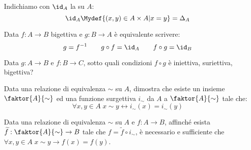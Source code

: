 \documentclass[11pt]{scrartcl}
\begin{document}
\begin{notation}
	Indichiamo con $\id_A$ la  su $A$:
	\[ \id_A \Mydef \{(x,y) \in A \times A | x = y\} = \Delta_A
		\]
\end{notation}

\begin{remark}
	Data $f : A \rightarrow B$ bigettiva e $g : B \rightarrow A$ è equivalente scrivere:
	\[ g = f^{-1} \qquad g \circ f = \id_A \qquad f \circ g = \id_B
		\]
\end{remark}

\begin{exercise}
	Data $g : A \rightarrow B$ e $f: B \rightarrow C$, sotto quali condizioni $f \circ g$ è iniettiva, suriettiva, bigettiva?
\end{exercise}

\begin{exercise}
	Data una relazione di equivalenza $\sim$ su $A$, dimostra che esiste un insieme $\faktor{A}{\sim}$ ed una funzione surgettiva $i_\sim$ da $A$ a $\faktor{A}{\sim}$
	tale che:
	\[ \forall x,y \in A \; x \sim y \leftrightarrow i_\sim(x) = i_\sim(y)
		\]
\end{exercise}

\begin{exercise}
	Data una relazione di equivalenza $\sim$ su $A$ e $f : A \rightarrow B$, affinché esista $\widetilde{f}: \faktor{A}{\sim} \rightarrow B$ tale che $f = \widetilde{f} \circ i_\sim$,
	è necessario e sufficiente che $\forall x,y \in A \; x \sim y \rightarrow f(x) = f(y)$.
\end{exercise}

\newpage
\end{document}
